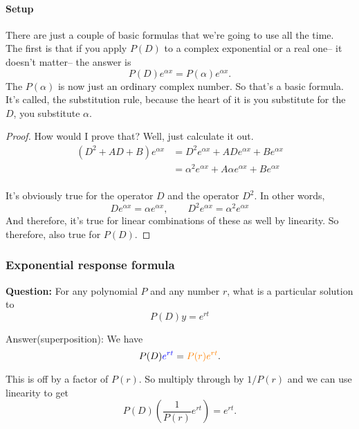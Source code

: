\paragraph{Setup}
There are just a couple of basic formulas that we're going to use all the time.\\
The first is that if you apply $P(D)$ to a complex exponential or a real one-- it doesn't matter--
the answer is 
\begin{equation*}
  P(D) e^{\alpha x} = P(\alpha) e^{\alpha x}. 
\end{equation*}
The $P(\alpha)$ is now just an ordinary complex number.
So that's a basic formula.
It's called, the substitution rule, because the heart of it is you substitute for the $D$,
you substitute $\alpha$.\\

\begin{proof}
  How would I prove that?
  Well, just calculate it out.
  \begin{align*}
    \left( D^2 + AD + B\right) e^{\alpha x}
    &= D^2 e^{\alpha x} + AD e^{\alpha x} + B  e^{\alpha x} \\
    &= \alpha ^2 e^{\alpha x} + A \alpha e^{\alpha x} + B  e^{\alpha x} \\
  \end{align*}

It's obviously true for the operator $D$ and the operator $D^2$.
In other words,
\begin{equation*}
  D  e^{\alpha x} = \alpha e^{\alpha x}, \qquad D^2  e^{\alpha x} = \alpha^2 e^{\alpha x} 
\end{equation*}
And therefore, it's true for linear combinations of these as well by linearity.
So therefore, also true for $P(D)$.
\end{proof}
\clearpage
\subsubsection{Exponential response formula}
\textbf{Question:} For any polynomial $P$ and any number $r$, what is a particular solution to
\begin{equation*}
  P(D)y = e^{rt}
\end{equation*}

{\color{blue} Answer(superposition):} We have
\begin{equation*}
  P(D) {\color{blue}{e^{rt}}}  = {\color{orange}{P(r) e^{rt}}} .
\end{equation*}

This is off by a factor of $P(r)$. So multiply through by $1/P(r)$ and we can use linearity to get
\begin{equation*}
  P(D)\left(\frac{1}{P(r)}e^{rt} \right) = e^{rt}.
\end{equation*}

